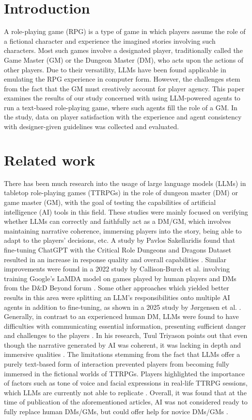 \documentclass[runningheads]{llncs}
\begin{document}
\section{Introduction}
A role-playing game (RPG) is a type of game in which players assume the role of a fictional character and experience the imagined stories involving such characters. Most such games involve a designated player, traditionally called the Game Master (GM) or the Dungeon Master (DM), who acts upon the actions of other players. Due to their versatility, LLMs have been found applicable in emulating the RPG experience in computer form. However, the challenges stem from the fact that the GM must creatively account for player agency.
This paper examines the results of our study concerned with using LLM-powered agents to run a text-based role-playing game, where such agents fill the role of a GM. In the study, data on player satisfaction with the experience and agent consistency with designer-given guidelines was collected and evaluated. 


\section{Related work}
There has been much research into the usage of large language models (LLMs) in tabletop role-playing games (TTRPGs) in the role of dungeon master (DM) or game master (GM), with the goal of testing the capabilities of artificial intelligence (AI) tools in this field. These studies were mainly focused on verifying whether LLMs can correctly and faithfully act as a DM/GM, which involves maintaining narrative coherence, immersing players into the story, being able to adapt to the players’ decisions, etc. A study by Pavlos Sakellaridis found that fine-tuning ChatGPT with the Critical Role Dungeons and Dragons Dataset \cite{ref_5} resulted in an increase in response quality and overall capabilities \cite{ref_2}. Similar improvements were found in a 2022 study by Callison-Burch et al. involving training Google’s LaMDA model on games played by human players and DMs from the D\&D Beyond forum \cite{ref_3}. Some other approaches which yielded better results in this area were splitting an LLM’s responsibilities onto multiple AI agents in addition to fine-tuning, as shown in a 2025 study by Jørgensen et al. \cite{ref_4}. Generally, in contrast to an experienced human DM, LLMs were found to have difficulties with communicating essential information, presenting sufficient danger and challenges to the players \cite{ref_2}. In his research, Tuul Triyason points out that even though the narrative generated by AI was coherent, it was lacking in depth and immersive qualities \cite{ref_1}. The limitations stemming from the fact that LLMs offer a purely text-based form of interaction prevented players from becoming fully immersed in the fictional worlds of TTRPGs. Players highlighted the importance of factors such as tone of voice and facial expressions in real-life TTRPG sessions, which LLMs are currently not able to replicate \cite{ref_1}. Overall, it was found that at the time of publication of the aforementioned articles, AI was not considered ready to fully replace human DMs/GMs, but could offer help for novice DMs/GMs \cite{ref_1,ref_2,ref_3,ref_4}.
\end{document}
